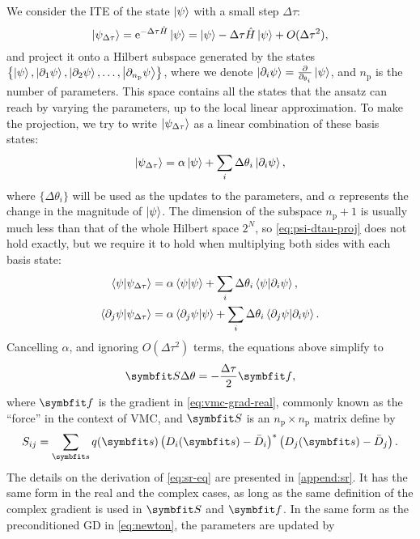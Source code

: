 We consider the ITE of the state $\ket{\psi}$ with a small step $\Delta \tau$:
\begin{equation}
\ket{\psi_{\Delta \tau}} = \mathrm{e}^{-\Delta \tau \hat{H}} \ket{\psi} = \ket{\psi} - \Delta \tau \hat{H} \ket{\psi} + O(\Delta \tau^2),
\end{equation}
and project it onto a Hilbert subspace generated by the states $\left\{ \ket{\psi}, \ket{\partial_1 \psi}, \ket{\partial_2 \psi}, \ldots, \ket{\partial_{n_\text{p}} \psi} \right\}$, where we denote $\ket{\partial_i \psi} = \frac{\partial}{\partial_{\theta_i}} \ket{\psi}$, and $n_\text{p}$ is the number of parameters. This space contains all the states that the ansatz can reach by varying the parameters, up to the local linear approximation. To make the projection, we try to write $\ket{\psi_{\Delta \tau}}$ as a linear combination of these basis states:
\begin{equation}
\ket{\psi_{\Delta \tau}} = \alpha \ket{\psi} + \sum_i \Delta \theta_i \ket{\partial_i \psi},
\label{eq:psi-dtau-proj}
\end{equation}
where $\{\Delta \theta_i\}$ will be used as the updates to the parameters, and $\alpha$ represents the change in the magnitude of $\ket{\psi}$. The dimension of the subspace $n_\text{p} + 1$ is usually much less than that of the whole Hilbert space $2^N$, so \cref{eq:psi-dtau-proj} does not hold exactly, but we require it to hold when multiplying both sides with each basis state:
\begin{align}
\ip{\psi}{\psi_{\Delta \tau}} &= \alpha \ip{\psi} + \sum_i \Delta \theta_i \ip{\psi}{\partial_i \psi}, \label{eq:sr-eq-1} \\
\ip{\partial_j \psi}{\psi_{\Delta \tau}} &= \alpha \ip{\partial_j \psi}{\psi} + \sum_i \Delta \theta_i \ip{\partial_j \psi}{\partial_i \psi}. \label{eq:sr-eq-2}
\end{align}
Cancelling $\alpha$, and ignoring $O(\Delta \tau^2)$ terms, the equations above simplify to
\begin{equation}
\mS \Delta \theta = -\frac{\Delta \tau}{2} \vf,
\label{eq:sr-eq}
\end{equation}
where $\vf$ is the gradient in \cref{eq:vmc-grad-real}, commonly known as the ``force'' in the context of VMC, and $\mS$ is an $n_\text{p} \times n_\text{p}$ matrix define by
\begin{equation}
S_{i j} = \sum_\vs q(\vs) \left( D_i(\vs) - \bar{D}_i \right)^* \left( D_j(\vs) - \bar{D}_j \right).
\label{eq:qgt}
\end{equation}
The details on the derivation of \cref{eq:sr-eq} are presented in \cref{append:sr}. It has the same form in the real and the complex cases, as long as the same definition of the complex gradient is used in $\mS$ and $\vf$. In the same form as the preconditioned GD in \cref{eq:newton}, the parameters are updated by
